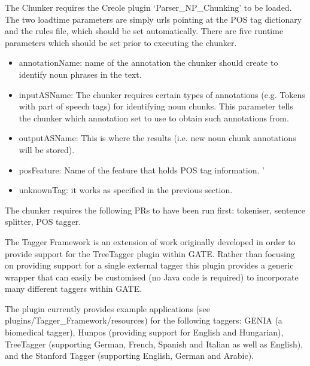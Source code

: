 
The Chunker requires the Creole plugin `Parser\_NP\_Chunking' to be loaded.
The two loadtime parameters are simply urls pointing at the POS tag dictionary
and the rules file, which should be set automatically.  There are five runtime
parameters which should be set prior to executing the chunker.

\begin{itemize}
\item annotationName: name of the annotation the chunker should create to
          identify noun phrases in the text.

\item inputASName: The chunker requires certain types of annotations (e.g.
          Tokens with part of speech tags) for identifying noun chunks.  This 
          parameter tells the chunker which annotation set to use to obtain such
          annotations from.

\item outputASName: This is where the results (i.e. new noun chunk 
         annotations will be stored).

\item posFeature: Name of the feature that holds POS tag information.
'
\item unknownTag: it works as specified in the previous section.
\end{itemize}


The chunker requires the following PRs to have been run first: tokeniser,
sentence splitter, POS tagger.


The Tagger Framework is an extension of work originally developed in order to
provide support for the TreeTagger plugin within GATE. Rather than focusing on providing support for a single external tagger
this plugin provides a generic wrapper that can easily be customised (no Java code is required) to
incorporate many different taggers within GATE.

The plugin currently provides example applications (see plugins/Tagger\_Framework/resources) for the following
taggers: GENIA (a biomedical tagger), Hunpos (providing support for English and Hungarian), TreeTagger
(supporting German, French, Spanish and Italian as well as English), and the Stanford Tagger
(supporting English, German and Arabic).

